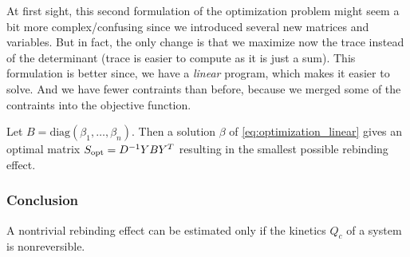 At first sight, this second formulation of the optimization problem might seem a bit more complex/confusing since we introduced several new matrices and variables.
But in fact, the only change is that we maximize now the trace instead of the determinant (trace is easier to compute as it is just a sum).
This formulation is better since, we have a \textit{linear} program, which makes it easier to solve. And we have fewer contraints than before, because we merged some of the contraints into the objective function.

Let $B = \mathrm{diag}(\beta_1,\dots, \beta_n)$. Then a solution $\beta$ of \eqref{eq:optimization_linear} gives an optimal matrix $S_{\mathrm{opt}} = D^{-1} YBY^T$ resulting in the smallest possible rebinding effect.



\subsubsection*{Conclusion}

A nontrivial rebinding effect can be estimated only if the kinetics $Q_c$ of a system is nonreversible. 